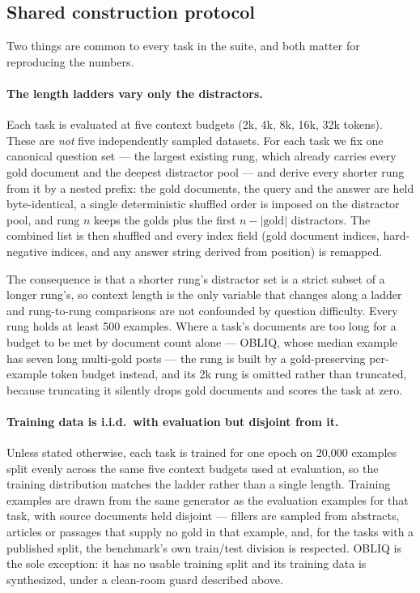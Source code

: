 \begin{claudeblock}

\subsection{Shared construction protocol}
\label{app:construction}

Two things are common to every task in the suite, and both matter for reproducing the numbers.

\paragraph{The length ladders vary only the distractors.} Each task is evaluated at five context
budgets (2k, 4k, 8k, 16k, 32k tokens). These are \emph{not} five independently sampled datasets.
For each task we fix one canonical question set --- the largest existing rung, which already carries
every gold document and the deepest distractor pool --- and derive every shorter rung from it by a
nested prefix: the gold documents, the query and the answer are held byte-identical, a single
deterministic shuffled order is imposed on the distractor pool, and rung $n$ keeps the golds plus
the first $n - |\text{gold}|$ distractors. The combined list is then shuffled and every index field
(gold document indices, hard-negative indices, and any answer string derived from position) is
remapped.

The consequence is that a shorter rung's distractor set is a strict subset of a longer rung's, so
context length is the only variable that changes along a ladder and rung-to-rung comparisons are
not confounded by question difficulty. Every rung holds at least 500 examples. Where a task's
documents are too long for a budget to be met by document count alone --- OBLIQ, whose median
example has seven long multi-gold posts --- the rung is built by a gold-preserving per-example
token budget instead, and its 2k rung is omitted rather than truncated, because truncating it
silently drops gold documents and scores the task at zero.

\paragraph{Training data is i.i.d.\ with evaluation but disjoint from it.} Unless stated otherwise,
each task is trained for one epoch on 20{,}000 examples split evenly across the same five context
budgets used at evaluation, so the training distribution matches the ladder rather than a single
length. Training examples are drawn from the same generator as the evaluation examples for that
task, with source documents held disjoint --- fillers are sampled from abstracts, articles or
passages that supply no gold in that example, and, for the tasks with a published split, the
benchmark's own train/test division is respected. OBLIQ is the sole exception: it has no usable
training split and its training data is synthesized, under a clean-room guard described above.
\end{claudeblock}

